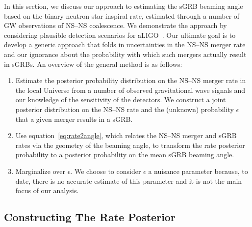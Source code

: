 \documentclass[twocolumn,nofootinbib]{revtex4-1}
\newcommand{\BNS}{\ac{NS}--\ac{NS}\xspace}
\begin{document}
In this section, we discuss our approach to estimating the \ac{sGRB} beaming angle based on the binary neutron star inspiral rate, estimated through a number of \ac{GW} observations of \BNS coalescence.
We demonstrate the approach by considering plausible detection scenarios for \ac{aLIGO}~\cite{Aasi:2013wya}.
Our ultimate goal is to develop a generic approach that folds in uncertainties in the \BNS merger rate and our ignorance about the probability with which such mergers actually result in \acp{sGRB}.
%
An overview of the general method is as follows:

\begin{enumerate}
    \item Estimate the posterior probability distribution on the \BNS merger rate
    in the local Universe from a number of observed gravitational wave signals
    and our knowledge of the sensitivity of the detectors.  We construct a joint
    posterior distribution on the \BNS rate and the (unknown) probability
    $\epsilon$ that a given merger results in a \ac{sGRB}.
\item Use equation~\ref{eq:rate2angle}, which relates the \BNS merger and
    \ac{sGRB} rates via the geometry of the beaming angle, to transform the rate
    posterior probability to a posterior probability on the mean \ac{sGRB}
    beaming angle.
\item Marginalize over $\epsilon$. We choose to consider $\epsilon$ a nuisance
    parameter because, to date, there is no accurate estimate of this parameter
    and it is not the main focus of our analysis. 
\end{enumerate}


\subsection{Constructing The Rate Posterior}
\label{sec:rate_posterior}
%
\end{document}
